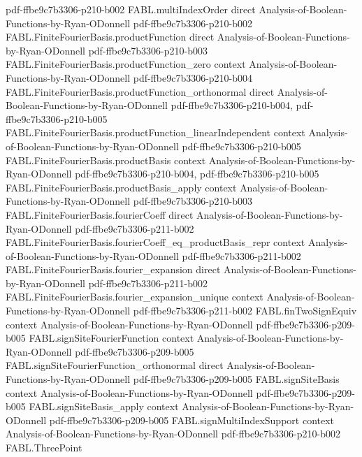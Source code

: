 \begin{theorem}
  {pdf-ffbe9c7b3306-p210-b002}
\proofstep
  {FABL.multiIndexOrder}
  {direct}
  {Analysis-of-Boolean-Functions-by-Ryan-ODonnell}
  {pdf-ffbe9c7b3306-p210-b002}
\proofstep
  {FABL.FiniteFourierBasis.productFunction}
  {direct}
  {Analysis-of-Boolean-Functions-by-Ryan-ODonnell}
  {pdf-ffbe9c7b3306-p210-b003}
\proofstep
  {FABL.FiniteFourierBasis.productFunction_zero}
  {context}
  {Analysis-of-Boolean-Functions-by-Ryan-ODonnell}
  {pdf-ffbe9c7b3306-p210-b004}
\proofstep
  {FABL.FiniteFourierBasis.productFunction_orthonormal}
  {direct}
  {Analysis-of-Boolean-Functions-by-Ryan-ODonnell}
  {pdf-ffbe9c7b3306-p210-b004,
    pdf-ffbe9c7b3306-p210-b005}
\proofstep
  {FABL.FiniteFourierBasis.productFunction_linearIndependent}
  {context}
  {Analysis-of-Boolean-Functions-by-Ryan-ODonnell}
  {pdf-ffbe9c7b3306-p210-b005}
\proofstep
  {FABL.FiniteFourierBasis.productBasis}
  {context}
  {Analysis-of-Boolean-Functions-by-Ryan-ODonnell}
  {pdf-ffbe9c7b3306-p210-b004,
    pdf-ffbe9c7b3306-p210-b005}
\proofstep
  {FABL.FiniteFourierBasis.productBasis_apply}
  {context}
  {Analysis-of-Boolean-Functions-by-Ryan-ODonnell}
  {pdf-ffbe9c7b3306-p210-b003}
\proofstep
  {FABL.FiniteFourierBasis.fourierCoeff}
  {direct}
  {Analysis-of-Boolean-Functions-by-Ryan-ODonnell}
  {pdf-ffbe9c7b3306-p211-b002}
\proofstep
  {FABL.FiniteFourierBasis.fourierCoeff_eq_productBasis_repr}
  {context}
  {Analysis-of-Boolean-Functions-by-Ryan-ODonnell}
  {pdf-ffbe9c7b3306-p211-b002}
\proofstep
  {FABL.FiniteFourierBasis.fourier_expansion}
  {direct}
  {Analysis-of-Boolean-Functions-by-Ryan-ODonnell}
  {pdf-ffbe9c7b3306-p211-b002}
\proofstep
  {FABL.FiniteFourierBasis.fourier_expansion_unique}
  {context}
  {Analysis-of-Boolean-Functions-by-Ryan-ODonnell}
  {pdf-ffbe9c7b3306-p211-b002}
\proofstep
  {FABL.finTwoSignEquiv}
  {context}
  {Analysis-of-Boolean-Functions-by-Ryan-ODonnell}
  {pdf-ffbe9c7b3306-p209-b005}
\proofstep
  {FABL.signSiteFourierFunction}
  {context}
  {Analysis-of-Boolean-Functions-by-Ryan-ODonnell}
  {pdf-ffbe9c7b3306-p209-b005}
\proofstep
  {FABL.signSiteFourierFunction_orthonormal}
  {direct}
  {Analysis-of-Boolean-Functions-by-Ryan-ODonnell}
  {pdf-ffbe9c7b3306-p209-b005}
\proofstep
  {FABL.signSiteBasis}
  {context}
  {Analysis-of-Boolean-Functions-by-Ryan-ODonnell}
  {pdf-ffbe9c7b3306-p209-b005}
\proofstep
  {FABL.signSiteBasis_apply}
  {context}
  {Analysis-of-Boolean-Functions-by-Ryan-ODonnell}
  {pdf-ffbe9c7b3306-p209-b005}
\proofstep
  {FABL.signMultiIndexSupport}
  {context}
  {Analysis-of-Boolean-Functions-by-Ryan-ODonnell}
  {pdf-ffbe9c7b3306-p210-b002}
\proofstep
  {FABL.ThreePoint}

\end{theorem}
